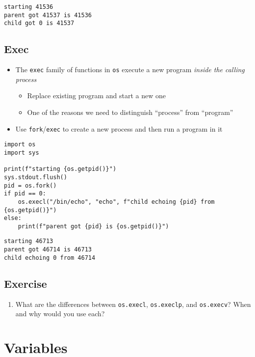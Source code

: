 \documentclass[krantzl]{krantz}
\begin{document}
\begin{lstlisting}[frame=tblr,backgroundcolor=\color{black!5}]
starting 41536
parent got 41537 is 41536
child got 0 is 41537
\end{lstlisting}

\section{Exec}
\begin{itemize}
\item The \texttt{exec} family of functions in \texttt{os} execute a new program
    \emph{inside the calling process}\begin{itemize}
\item Replace existing program and start a new one

\item One of the reasons we need to distinguish “process” from “program”

\end{itemize}


\item Use \texttt{fork}/\texttt{exec} to create a new process and then run a program in it

\end{itemize}
\begin{lstlisting}[frame=tblr]
import os
import sys

print(f"starting {os.getpid()}")
sys.stdout.flush()
pid = os.fork()
if pid == 0:
    os.execl("/bin/echo", "echo", f"child echoing {pid} from {os.getpid()}")
else:
    print(f"parent got {pid} is {os.getpid()}")
\end{lstlisting}

\begin{lstlisting}[frame=tblr,backgroundcolor=\color{black!5}]
starting 46713
parent got 46714 is 46713
child echoing 0 from 46714
\end{lstlisting}

\section{Exercise}
\begin{enumerate}
\item What are the differences between \texttt{os.execl}, \texttt{os.execlp}, and \texttt{os.execv}?
    When and why would you use each?

\end{enumerate}
\chapter{Variables}\label{var}
\end{document}
